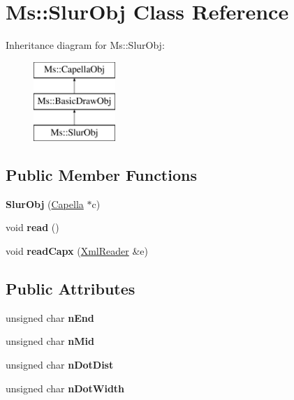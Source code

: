 \hypertarget{class_ms_1_1_slur_obj}{}\section{Ms\+:\+:Slur\+Obj Class Reference}
\label{class_ms_1_1_slur_obj}
Inheritance diagram for Ms\+:\+:Slur\+Obj\+:\begin{figure}[H]
\begin{center}
\leavevmode
\includegraphics[height=3.000000cm]{class_ms_1_1_slur_obj}
\end{center}
\end{figure}
\subsection*{Public Member Functions}
\begin{DoxyCompactItemize}
\item 
\mbox{\label{class_ms_1_1_slur_obj_a6d745513782a59d7aba2e8e177811494}} 
{\bfseries Slur\+Obj} (\hyperlink{class_ms_1_1_capella}{Capella} $\ast$c)
\item 
\mbox{\label{class_ms_1_1_slur_obj_a44d1918a8c5a47901d64b0e77b91679d}} 
void {\bfseries read} ()
\item 
\mbox{\label{class_ms_1_1_slur_obj_a89fa2df6850cb6011c61671fbf596384}} 
void {\bfseries read\+Capx} (\hyperlink{class_ms_1_1_xml_reader}{Xml\+Reader} \&e)
\end{DoxyCompactItemize}
\subsection*{Public Attributes}
\begin{DoxyCompactItemize}
\item 
\mbox{\label{class_ms_1_1_slur_obj_aff7c7f570b29825e1809e1af63b4516f}} 
unsigned char {\bfseries n\+End}
\item 
\mbox{\label{class_ms_1_1_slur_obj_afb4f71451777194d42014dd81bbc3a8b}} 
unsigned char {\bfseries n\+Mid}
\item 
\mbox{\label{class_ms_1_1_slur_obj_ac8321d64e68c7d9f6c2ad6edfb579f18}} 
unsigned char {\bfseries n\+Dot\+Dist}
\item 
\mbox{\label{class_ms_1_1_slur_obj_a594f144a6547a012d1dd9274e46c7bb9}} 
unsigned char {\bfseries n\+Dot\+Width}
\end{DoxyCompactItemize}
